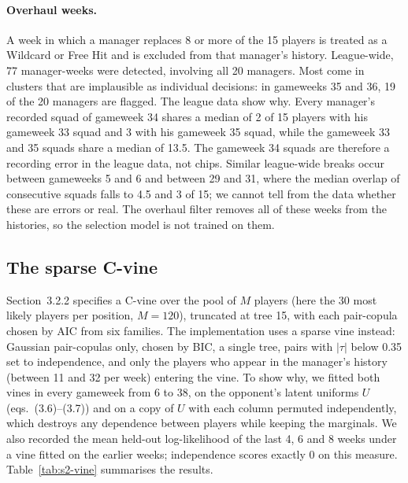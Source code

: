 \documentclass[12pt,oneside,a4paper]{book}
\theoremstyle{definition}
\theoremstyle{remark}
\begin{document}
	\paragraph{Overhaul weeks.} A week in which a manager replaces 8 or more of the 15 players is
	treated as a Wildcard or Free Hit and is excluded from that manager's history. League-wide, 77
	manager-weeks were detected, involving all 20 managers. Most come in clusters that are
	implausible as individual decisions: in gameweeks 35 and 36, 19 of the 20 managers are flagged.
	The league data show why. Every manager's recorded squad of gameweek 34 shares a median of 2 of
	15 players with his gameweek 33 squad and 3 with his gameweek 35 squad, while the gameweek 33 and
	35 squads share a median of 13.5. The gameweek 34 squads are therefore a recording error in
	the league data, not chips. Similar league-wide breaks occur between gameweeks 5 and 6 and
	between 29 and 31, where the median overlap of consecutive squads falls to 4.5 and 3 of 15; we
	cannot tell from the data whether these are errors or real. The overhaul filter removes all
	of these weeks from the histories, so the selection model is not trained on them.

	\subsection{The sparse C-vine}
	\label{sec:s2-vine}

	Section~3.2.2 specifies a C-vine over the pool of $M$ players (here the 30 most likely
	players per position, $M=120$), truncated at tree 15, with each pair-copula chosen by AIC from
	six families. The implementation uses a sparse vine instead: Gaussian pair-copulas only, chosen
	by BIC, a single tree, pairs with $|\tau|$ below 0.35 set to independence, and only the players
	who appear in the manager's history (between 11 and 32 per week) entering the vine. To show why,
	we fitted both vines in every gameweek from 6 to 38, on the opponent's latent uniforms $U$
	(eqs.~(3.6)--(3.7)) and on a copy of $U$ with each column permuted independently, which destroys
	any dependence between players while keeping the marginals. We also recorded the mean held-out
	log-likelihood of the last 4, 6 and 8 weeks under a vine fitted on the earlier weeks;
	independence scores exactly 0 on this measure. Table~\ref{tab:s2-vine} summarises the results.
\end{document}
